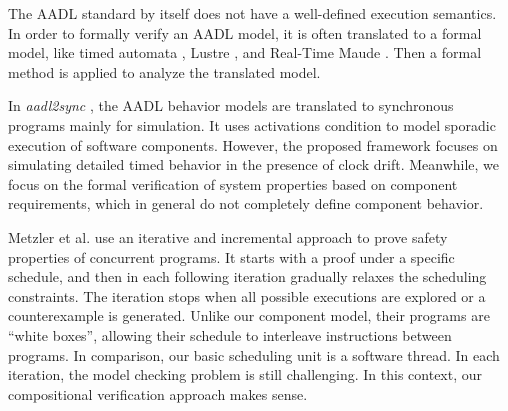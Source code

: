 The AADL standard by itself does not have a well-defined execution semantics. In order to formally verify an AADL model, it is often translated to a formal model, like timed automata \cite{behaviorAnnex}, Lustre \cite{AADL2Sync}, and Real-Time Maude \cite{maude}. Then a formal method is applied to analyze the translated model. 

In \emph{aadl2sync} \cite{AADL2Sync}, the AADL behavior models are translated to synchronous programs mainly for simulation. It uses activations condition to model sporadic execution of software components. However, the proposed framework focuses on simulating detailed timed behavior in the presence of clock drift. Meanwhile, we focus on the formal verification of system properties based on component requirements, which in general do not completely define component behavior.

Metzler et al. \cite{Metzler2020} use an iterative and incremental approach to prove safety properties of concurrent programs. It starts with a proof under a specific schedule, and then in each following iteration gradually relaxes the scheduling constraints. The iteration stops when all possible executions are explored or a counterexample is generated. Unlike our component model, their programs are ``white boxes'', allowing their schedule to interleave instructions between programs. In comparison, our basic scheduling unit is a software thread. In each iteration, the model checking problem is still challenging. In this context, our compositional verification approach makes sense.

